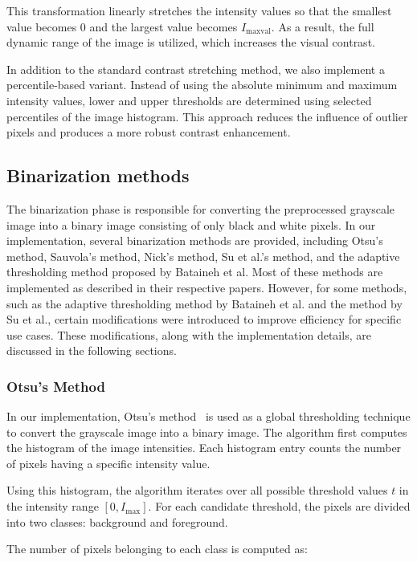 This transformation linearly stretches the intensity values so that the smallest value becomes $0$ and the largest value becomes $I_{\text{maxval}}$. As a result, the full dynamic range of the image is utilized, which increases the visual contrast.

In addition to the standard contrast stretching method, we also implement a percentile-based variant. Instead of using the absolute minimum and maximum intensity values, lower and upper thresholds are determined using selected percentiles of the image histogram. This approach reduces the influence of outlier pixels and produces a more robust contrast enhancement.

\subsection{Binarization methods}

The binarization phase is responsible for converting the preprocessed grayscale image into a binary image consisting of only black and white pixels. In our implementation, several binarization methods are provided, including Otsu's method, Sauvola's method, Nick's method, Su et al.'s method, and the adaptive thresholding method proposed by Bataineh et al. Most of these methods are implemented as described in their respective papers. However, for some methods, such as the adaptive thresholding method by Bataineh et al. and the method by Su et al., certain modifications were introduced to improve efficiency for specific use cases. These modifications, along with the implementation details, are discussed in the following sections.

\subsubsection{Otsu's Method}
In our implementation, Otsu's method~\cite{otsu1979threshold} is used as a global thresholding
technique to convert the grayscale image into a binary image.
The algorithm first computes the histogram of the image intensities.
Each histogram entry counts the number of pixels having a specific
intensity value.

Using this histogram, the algorithm iterates over all possible
threshold values $t$ in the intensity range $[0, I_{\text{max}}]$.
For each candidate threshold, the pixels are divided into two classes:
background and foreground.

The number of pixels belonging to each class is computed as:

